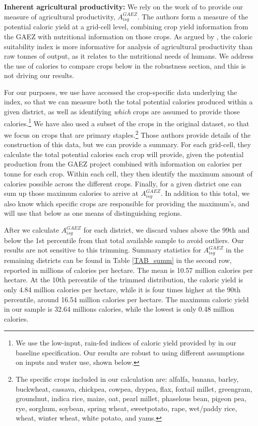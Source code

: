 \documentclass[11pt]{article}
\begin{document}
\vspace{.5cm}\noindent\textbf{Inherent agricultural productivity:} We rely on the work of \citet{galorozak2016} to provide our measure of agricultural productivity, $A^{GAEZ}_{isg}$. The authors form a measure of the potential caloric yield at a grid-cell level, combining crop yield information from the GAEZ with nutritional information on those crops. As argued by \citet{galorozak2016}, the caloric suitability index is more informative for analysis of agricultural productivity than raw tonnes of output, as it relates to the nutritional needs of humans. We address the use of calories to compare crops below in the robustness section, and this is not driving our results.

For our purposes, we use have accessed the crop-specific data underlying the \citet{galorozak2016} index, so that we can measure both the total potential calories produced within a given district, as well as identifying \textit{which} crops are assumed to provide those calories.\footnote{We use the low-input, rain-fed indices of caloric yield provided by \citet{galorozak2016} in our baseline specification. Our results are robust to using different assumptions on inputs and water use, shown below.} We have also used a subset of the crops in the original \citet{galorozak2016} dataset, so that we focus on crops that are primary staples.\footnote{The specific crops included in our calculation are: alfalfa, banana, barley, buckwheat, cassava, chickpea, cowpea, drypea, flax, foxtail millet, greengram, groundnut, indica rice, maize, oat, pearl millet, phaselous bean, pigeon pea, rye, sorghum, soybean, spring wheat, sweetpotato, rape, wet/paddy rice, wheat, winter wheat, white potato, and yams.} Those authors provide details of the construction of this data, but we can provide a summary. For each grid-cell, they calculate the total potential calories each crop will provide, given the potential production from the GAEZ project \citep{gaez} combined with information on calories per tonne for each crop. Within each cell, they then identify the maximum amount of calories possible across the different crops. Finally, for a given district one can sum up those maximum calories to arrive at $A^{GAEZ}_{isg}$. In addition to this total, we also know which specific crops are responsible for providing the maximum's, and will use that below as one means of distinguishing regions.

After we calculate $A^{GAEZ}_{isg}$ for each district, we discard values above the 99th and below the 1st percentile from that total available sample to avoid outliers. Our results are not sensitive to this trimming. Summary statistics for $A^{GAEZ}_{isg}$ in the remaining districts can be found in Table \ref{TAB_summ} in the second row, reported in millions of calories per hectare. The mean is 10.57 million calories per hectare. At the 10th percentile of the trimmed distribution, the caloric yield is only 4.84 million calories per hectare, while it is four times higher at the 90th percentile, around 16.54 million calories per hectare. The maximum caloric yield in our sample is 32.64 millions calories, while the lowest is only 0.48 million calories. 
\end{document}
